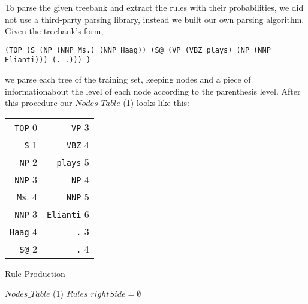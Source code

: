 \documentclass[a4paper,11pt]{article}
\begin{document}
To parse the given treebank and extract the rules with their probabilities, we did not use a third-party parsing library, instead we built our own parsing algorithm. Given the treebank's form,
\begin{verbatim}
(TOP (S (NP (NNP Ms.) (NNP Haag)) (S@ (VP (VBZ plays) (NP (NNP Elianti))) (. .))) )
\end{verbatim}
we parse each tree of the training set, keeping nodes and a piece of informationabout the level of each node according to the parenthesis level. After this procedure our $Nodes\_Table$ (1) looks like this:
\begin{table}[h!]
\begin{scriptsize}
\begin{center}
\begin{tabular}{ r r }
\texttt{TOP} 0         &      \texttt{VP} 3 \\
\texttt{S} 1           &      \texttt{VBZ} 4   \\
\texttt{NP} 2          &      \texttt{plays} 5     \\           
\texttt{NNP} 3         &      \texttt{NP} 4\\
\texttt{Ms}. 4          &     \texttt{NNP} 5     \\                     
\texttt{NNP} 3         &      \texttt{Elianti} 6\\
\texttt{Haag} 4        &      \texttt{.} 3\\
\texttt{S@} 2          &      \texttt{.} 4
\end{tabular}
\end{center}
\end{scriptsize}
\end{table}
\begin{algorithm}[t!]
\caption{Rule Production}
\label{rule}
\begin{small}
\begin{algorithmic}[1]
$Nodes\_Table$ (1)
$Rules$
\STATE
{}
\STATE $rightSide = \emptyset$
\ELSE
{}
\ENDIF
\ENDIF
{}
\ENDIF
\ENDIF
\ENDFOR
\ENDFOR
\end{algorithmic}
\end{small}
\end{algorithm}
\end{document}
